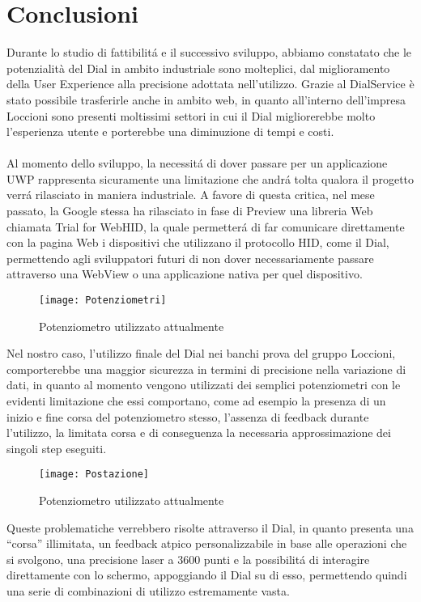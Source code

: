 \chapter{Conclusioni}
\label{chap:Capitolo1}

Durante lo studio di fattibilitá e il successivo sviluppo, abbiamo constatato che le potenzialità del Dial in ambito industriale sono molteplici, dal miglioramento della User Experience alla precisione adottata nell’utilizzo.
Grazie al DialService è stato possibile trasferirle anche in ambito web, in quanto all’interno dell’impresa Loccioni sono presenti moltissimi settori in cui il Dial migliorerebbe molto l’esperienza utente e porterebbe una diminuzione di tempi e costi.\\ \\
Al momento dello sviluppo, la necessitá di dover passare per un applicazione UWP rappresenta sicuramente una limitazione che andrá tolta qualora il progetto verrá rilasciato in maniera industriale.
A favore di questa critica, nel mese passato, la Google stessa ha rilasciato in fase di Preview una libreria Web chiamata Trial for WebHID, la quale permetterá di far comunicare direttamente con la pagina Web i dispositivi che utilizzano il protocollo HID, come il Dial, permettendo agli sviluppatori futuri di non dover necessariamente passare attraverso una WebView o una applicazione nativa per quel dispositivo.\\

\begin{figure}[htpb!]
\center
  \texttt{[image: Potenziometri]}
  \caption{Potenziometro utilizzato attualmente}
\end{figure}

Nel nostro caso, l’utilizzo finale del Dial nei banchi prova del gruppo Loccioni, comporterebbe una maggior sicurezza in termini di precisione nella variazione di dati, in quanto al momento vengono utilizzati dei semplici potenziometri con le evidenti limitazione che essi comportano, come ad esempio la presenza di un inizio e fine corsa del potenziometro stesso, l’assenza di feedback durante l’utilizzo, la limitata corsa e di conseguenza la necessaria approssimazione dei singoli step eseguiti.

\begin{figure}[htpb!]
\center
\texttt{[image: Postazione]}
\caption{Potenziometro utilizzato attualmente}
\end{figure}

Queste problematiche verrebbero risolte attraverso il Dial, in quanto presenta una “corsa” illimitata, un feedback atpico personalizzabile in base alle operazioni che si svolgono, una precisione laser a 3600 punti e la possibilitá di interagire direttamente con lo schermo, appoggiando il Dial su di esso, permettendo quindi una serie di combinazioni di utilizzo estremamente vasta.